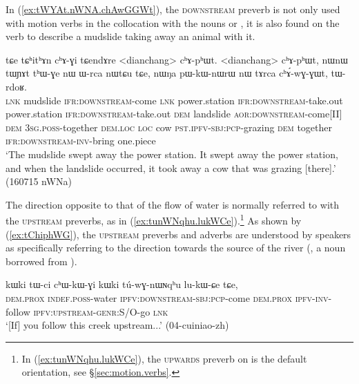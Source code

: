 In (\ref{ex:tWYAt.nWNA.chAwGGWt}), the \textsc{downstream} preverb is not only used with motion verbs in the collocation with the nouns  or , it is also found on the verb  to describe a mudslide taking away an animal with it.

 \begin{exe}
\ex \label{ex:tWYAt.nWNA.chAwGGWt}
\gll  tɕe tɕʰitʰɤn cʰɤ-ɣi tɕendɤre <dianchang> cʰɤ-pʰɯt. <dianchang> cʰɤ-pʰɯt, nɯnɯ tɯɲɤt tʰɯ-ɣe nɯ ɯ-rca nɯtɕu tɕe, 
nɯŋa pɯ-kɯ-nɯrɯ nɯ tɤrca cʰɤ́-wɣ-ɣɯt, tɯ-rdoʁ. \\
\textsc{lnk} mudslide \textsc{ifr}:\textsc{downstream}-come \textsc{lnk} power.station \textsc{ifr}:\textsc{downstream}-take.out power.station \textsc{ifr}:\textsc{downstream}-take.out \textsc{dem} landslide \textsc{aor}:\textsc{downstream}-come[II] \textsc{dem} \textsc{3sg}.\textsc{poss}-together \textsc{dem}.\textsc{loc} \textsc{loc} cow \textsc{pst}.\textsc{ipfv}-\textsc{sbj}:\textsc{pcp}-grazing \textsc{dem} together \textsc{ifr}:\textsc{downstream}-\textsc{inv}-bring one.piece \\
\glt `The mudslide swept away the power station. It swept away the power station, and when the landslide occurred, it took away a cow that was grazing [there].' (160715 nWNa)
\end{exe}

The direction opposite to that of the flow of water is normally referred to with the \textsc{upstream} preverbs, as in (\ref{ex:tunWNqhu.lukWCe}).\footnote{In (\ref{ex:tunWNqhu.lukWCe}), the \textsc{upwards} preverb on  is the default orientation, see §\ref{sec:motion.verbs}. } As shown by (\ref{ex:tChiphWG}), the \textsc{upstream} preverbs and adverbs are understood by speakers as specifically referring to the direction towards the source of the river (, a noun borrowed from ).

 \begin{exe}
\ex \label{ex:tunWNqhu.lukWCe}
\gll  kɯki tɯ-ci cʰɯ-kɯ-ɣi kɯki tú-wɣ-nɯɴqʰu lu-kɯ-ɕe tɕe,  \\
\textsc{dem}.\textsc{prox} \textsc{indef}.\textsc{poss}-water \textsc{ipfv}:\textsc{downstream}-\textsc{sbj}:\textsc{pcp}-come \textsc{dem}.\textsc{prox} \textsc{ipfv}-\textsc{inv}-follow \textsc{ipfv}:\textsc{upstream}-\textsc{genr}:S/O-go \textsc{lnk} \\
\glt `[If] you follow this creek upstream...' (04-cuiniao-zh)
\end{exe}

